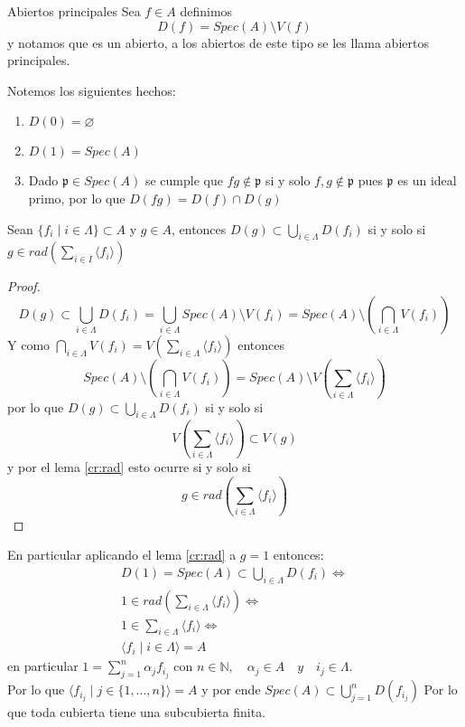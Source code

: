 \documentclass[14pt]{extarticle}
\begin{document}
\begin{definicion}{Abiertos principales}{}
    Sea $f\in A$ definimos
    $$D(f) = Spec(A) \setminus V(f)$$
    y notamos que es un abierto, a los abiertos de 
    este tipo se les llama abiertos principales.
\end{definicion}

\begin{observacion}{}{}
    Notemos los siguientes hechos:
    \begin{enumerate}
        \item $D(0)=\varnothing$
        \item $D(1)=Spec(A)$
        \item Dado $\mathfrak{p} \in Spec(A)$ se cumple
        que $fg \notin \mathfrak{p}$ si y solo $f,g \notin \mathfrak{p}$
        pues $\mathfrak{p}$ es un ideal primo, por lo que $D(fg)= D(f)\cap D(g)$
    \end{enumerate}
    
\end{observacion}

\begin{lema}{}{}
    Sean $\{f_i\mid i\in \Lambda\} \subset A$ y $g \in A$,
    entonces $D(g)\subset \bigcup_{i\in \Lambda}D(f_i) $ si y solo si
    $g \in rad \left( \sum_{i\in I} \langle f_i \rangle\right)$
\end{lema}
\begin{proof}
    $$D(g) \subset \bigcup_{i\in \Lambda}D(f_i) = \bigcup_{i\in  \Lambda} Spec(A)\setminus V(f_i)
    = Spec(A)\setminus \left( \bigcap_{i\in  \Lambda}V(f_i)\right) $$
    Y como $\bigcap_{i\in  \Lambda}V(f_i) = V(\sum_{i\in \Lambda}\langle f_i \rangle)$
    entonces $$Spec(A)\setminus \left(\bigcap_{i\in  \Lambda}V(f_i) \right) = Spec(A)\setminus V\left(\sum_{i\in \Lambda}\langle f_i \rangle\right)$$
    por lo que $D(g)\subset \bigcup_{i \in \Lambda}D(f_i)$ si y solo si
    $$V\left(\sum_{i\in \Lambda}\langle f_i \rangle \right) \subset V(g)$$
    y por el lema \ref{cr:rad} esto ocurre si y solo si
    $$g \in rad \left(\sum_{i\in \Lambda}\langle f_i \rangle\right)$$
\end{proof}

\begin{observacion}{}{}
    En particular aplicando el lema \ref{cr:rad} a 
    $g = 1$ entonces:
    \begin{align*}
        D(1) = Spec(A) \subset \bigcup_{i \in \Lambda } D(f_i) \iff\\
        1 \in rad(\sum_{i\in \Lambda} \langle f_i \rangle) \iff \\
        1\in \sum_{i\in \Lambda} \langle f_i \rangle \iff \\
        \langle f_i \mid i\in \Lambda \rangle = A
    \end{align*} 
    en particular $1 = \sum_{j=1}^{n} \alpha_j f_{i_j}$ con $n\in \mathbb{N}, \quad \alpha_j \in A \quad y \quad i_j \in \Lambda$.\\
    Por lo que $\langle f_{i_j}\mid j\in\{1,...,n \} \rangle = A$
    y por ende $Spec(A) \subset \bigcup_{j=1}^{n}D(f_{i_j})$
    Por lo que toda cubierta tiene una subcubierta finita.
\end{observacion}
\end{document}
